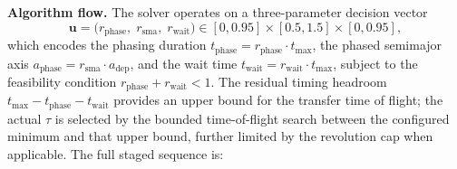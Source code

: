     \noindent\textbf{Algorithm flow.}
    The solver operates on a three-parameter decision vector
    \begin{equation}
        \mathbf{u} = \bigl(r_{\mathrm{phase}},\; r_{\mathrm{sma}},\; r_{\mathrm{wait}}\bigr) \in [0,0.95]\times[0.5,1.5]\times[0,0.95],
        \label{eq:transfer_decision_vector}
    \end{equation}
    which encodes the phasing duration \(t_{\mathrm{phase}} = r_{\mathrm{phase}} \cdot t_{\max}\), the phased semimajor axis \(a_{\mathrm{phase}} = r_{\mathrm{sma}} \cdot a_{\mathrm{dep}}\), and the wait time \(t_{\mathrm{wait}} = r_{\mathrm{wait}} \cdot t_{\max}\), subject to the feasibility condition \mbox{\(r_{\mathrm{phase}}+r_{\mathrm{wait}}<1\)}. The residual timing headroom \(t_{\max}-t_{\mathrm{phase}}-t_{\mathrm{wait}}\) provides an upper bound for the transfer time of flight; the actual \(\tau\) is selected by the bounded time-of-flight search between the configured minimum and that upper bound, further limited by the revolution cap when applicable. The full staged sequence is:
